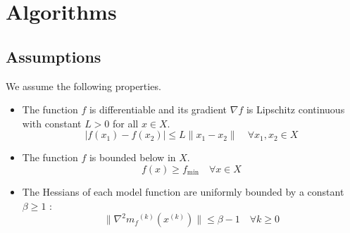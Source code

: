 \documentclass{article}
\theoremstyle{case}
\newcommand{\domain}{X}
\newcommand{\modelk}{{{m}_f}^{(k)}}
\newcommand{\iteratek}{{x}^{(k)}}
\begin{document}


\section{Algorithms}

\subsection{Assumptions}

We assume the following properties.

\begin{itemize}
\item The function $f$ is differentiable and its gradient $\nabla f$ is Lipschitz continuous with constant $L > 0$ for all $x \in \domain$.
\begin{equation}
\label{A1}
|f(x_1) - f(x_2)| \le L \|x_1 - x_2\| \quad \forall x_1, x_2 \in \domain
\end{equation}
\item \label{A2} The function $f$ is bounded below in $\domain$.
\begin{equation}
\label{A2}
f(x) \ge f_{\text{min}} \quad \forall x \in \domain
\end{equation}

\item The Hessians of each model function are uniformly bounded by a constant $\beta \ge 1$ :
\begin{equation}
\label{A3}
\|\nabla^2 \modelk(\iteratek)\| \le \beta - 1 \quad \forall k \ge 0
\end{equation}

\end{itemize}




\end{document}
